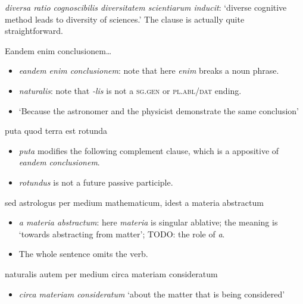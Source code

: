 \documentclass[a4paper, 12pt]{article}
\newcommand{\form}[1]{\emph{#1}}
\newcommand*{\category}[1]{\textsc{#1}}
\newcommand{\translate}[1]{`#1'}
\begin{document}
\begin{exe}
    \ex \form{diversa ratio cognoscibilis diversitatem scientiarum inducit}: 
    \translate{diverse cognitive method leads to diversity of sciences.}
    The clause is actually quite straightforward.
\end{exe}

\begin{exe}
    \ex Eandem enim conclusionem\dots
\end{exe}

\begin{itemize}
    \item \form{eandem enim conclusionem}: 
    note that here \form{enim} breaks a noun phrase.
    \item \form{naturalis}: note that \form{-lis} is not a \category{sg.gen} or \category{pl.abl/dat} ending.
    \item \translate{Because the astronomer and the physicist demonstrate the same conclusion}
\end{itemize}

\begin{exe}
    \ex puta quod terra est rotunda
\end{exe}

\begin{itemize}
    \item \form{puta} modifies the following complement clause, 
    which is a appositive of \form{eandem conclusionem}.
    \item \form{rotundus} is not a future passive participle.
\end{itemize}

\begin{exe}
    \ex sed astrologus per medium mathematicum, idest a materia abstractum 
\end{exe}

\begin{itemize}
    \item \form{a materia abstractum}: 
    here \form{materia} is singular ablative; 
    the meaning is \translate{towards abstracting from matter}; 
    TODO: the role of \form{a}.
    \item The whole sentence omits the verb.
\end{itemize}

\begin{exe}
    \ex naturalis autem per medium circa materiam consideratum 
\end{exe}

\begin{itemize}
    \item \form{circa materiam consideratum} \translate{about the matter that is being considered}
\end{itemize}
\end{document}
